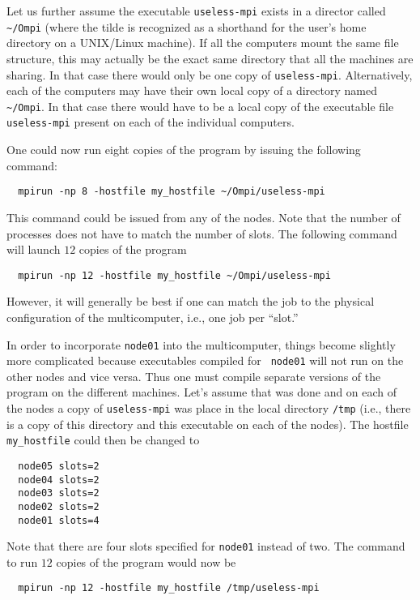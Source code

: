 Let us further assume the executable {\tt useless-mpi} exists in a
director called \verb+~/Ompi+ (where the tilde is recognized as a
shorthand for the user's home directory on a UNIX/Linux machine).  If
all the computers mount the same file structure, this may actually be
the exact same directory that all the machines are sharing.  In that
case there would only be one copy of {\tt useless-mpi}.
Alternatively, each of the computers may have their own local copy of
a directory named \verb+~/Ompi+.  In that case there would have to be
a local copy of the executable file {\tt useless-mpi} present on each
of the individual computers.

One could now run eight copies of the program by issuing the following
command:
\begin{verbatim}
  mpirun -np 8 -hostfile my_hostfile ~/Ompi/useless-mpi
\end{verbatim}
This command could be issued from any of the nodes.  Note that the
number of processes does not have to match the number of slots.  The
following command will launch $12$ copies of the program
\begin{verbatim}
  mpirun -np 12 -hostfile my_hostfile ~/Ompi/useless-mpi
\end{verbatim}
However, it will generally be best if one can match the job to the
physical configuration of the multicomputer, i.e., one job per
``slot.''  

In order to incorporate {\tt node01} into the multicomputer, things
become slightly more complicated because executables compiled for {\tt
  node01} will not run on the other nodes and vice versa.  Thus one
must compile separate versions of the program on the different
machines.  Let's assume that was done and on each of the nodes a copy
of {\tt useless-mpi} was place in the local directory {\tt /tmp}
(i.e., there is a copy of this directory and this executable on each
of the nodes).  The hostfile {\tt my\_hostfile} could then be changed
to
\begin{verbatim}
  node05 slots=2
  node04 slots=2
  node03 slots=2
  node02 slots=2
  node01 slots=4
\end{verbatim}
Note that there are four slots specified for {\tt node01} instead of
two.  The command to run $12$ copies of the program would now be
\begin{verbatim}
  mpirun -np 12 -hostfile my_hostfile /tmp/useless-mpi
\end{verbatim}

